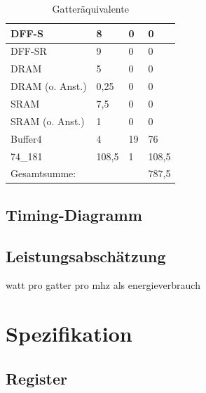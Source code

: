 \documentclass[11pt]{report}
\begin{document}
\begin{table}[]
\begin{tabular}{llll}
			\multicolumn{1}{|l|}{DFF-S}                  & \multicolumn{1}{l|}{8}     & \multicolumn{1}{l|}{0}  & \multicolumn{1}{l|}{0}     \\ \hline
			\multicolumn{1}{|l|}{DFF-SR}                 & \multicolumn{1}{l|}{9}     & \multicolumn{1}{l|}{0}  & \multicolumn{1}{l|}{0}     \\ \hline
			\multicolumn{1}{|l|}{DRAM}                   & \multicolumn{1}{l|}{5}     & \multicolumn{1}{l|}{0}  & \multicolumn{1}{l|}{0}     \\ \hline
			\multicolumn{1}{|l|}{DRAM (o. Anst.)}        & \multicolumn{1}{l|}{0,25}  & \multicolumn{1}{l|}{0}  & \multicolumn{1}{l|}{0}     \\ \hline
			\multicolumn{1}{|l|}{SRAM}                   & \multicolumn{1}{l|}{7,5}   & \multicolumn{1}{l|}{0}  & \multicolumn{1}{l|}{0}     \\ \hline
			\multicolumn{1}{|l|}{SRAM (o. Anst.)}        & \multicolumn{1}{l|}{1}     & \multicolumn{1}{l|}{0}  & \multicolumn{1}{l|}{0}     \\ \hline
			\multicolumn{1}{|l|}{Buffer4}                & \multicolumn{1}{l|}{4}     & \multicolumn{1}{l|}{19} & \multicolumn{1}{l|}{76}    \\ \hline
			\multicolumn{1}{|l|}{74\_181}                & \multicolumn{1}{l|}{108,5} & \multicolumn{1}{l|}{1}  & \multicolumn{1}{l|}{108,5} \\ \hline\hline
			Gesamtsumme:                                 &                            &                         & 787,5                      \\ \hline
		\end{tabular}
		\caption{Gatteräquivalente}
	\end{table}
	
	
	\section{Timing-Diagramm}
	\section{Leistungsabschätzung}
	watt pro gatter pro mhz als energieverbrauch
	
	
	\chapter{Spezifikation}
	
	\section{Register}
\end{document}

